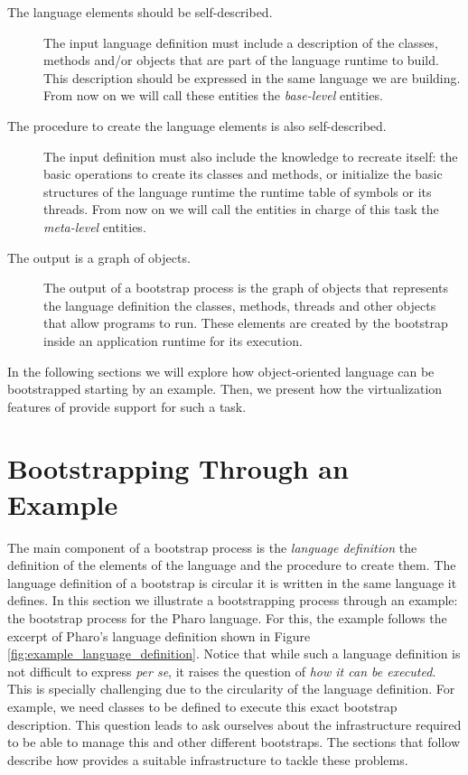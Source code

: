 \begin{description}

\item[The language elements should be self-described.] The input language definition must include a description of the classes, methods and/or objects that are part of the language runtime to build. This description should be expressed in the same language we are building. From now on we will call these entities the \emph{base-level} entities.

\item[The procedure to create the language elements is also self-described.] The input definition must also include the knowledge to recreate itself: the basic operations to create its classes and methods, or initialize the basic structures of the language runtime \eg the runtime table of symbols or its threads. From now on we will call the entities in charge of this task the \emph{meta-level} entities.

\item[The output is a graph of objects.] The output of a bootstrap process is the graph of objects that represents the language definition \ie the classes, methods, threads and other objects that allow programs to run. These elements are created by the bootstrap inside an application runtime for its execution. %

\end{description}

\noindent In the following sections we will explore how object-oriented language can be bootstrapped starting by an example. Then, we present how the virtualization features of \Vtt provide support for such a task.

\section{Bootstrapping Through an Example}\label{sec:bootstrapping_process}

The main component of a bootstrap process is the \emph{language definition} \ie the definition of the elements of the language and the procedure to create them. The language definition of a bootstrap is circular \ie it is written in the same language it defines. In this section we illustrate a bootstrapping process through an example: the bootstrap process for the Pharo language. For this, the example follows the excerpt of Pharo's language definition shown in Figure \ref{fig:example_language_definition}. Notice that while such a language definition is not difficult to express \emph{per se}, it raises the question of \emph{how it can be executed}. This is specially challenging due to the circularity of the language definition. For example, we need classes to be defined to execute this exact bootstrap description. This question leads to ask ourselves about the infrastructure required to be able to manage this and other different bootstraps. The sections that follow describe how \Vtt provides a suitable infrastructure to tackle these problems.

